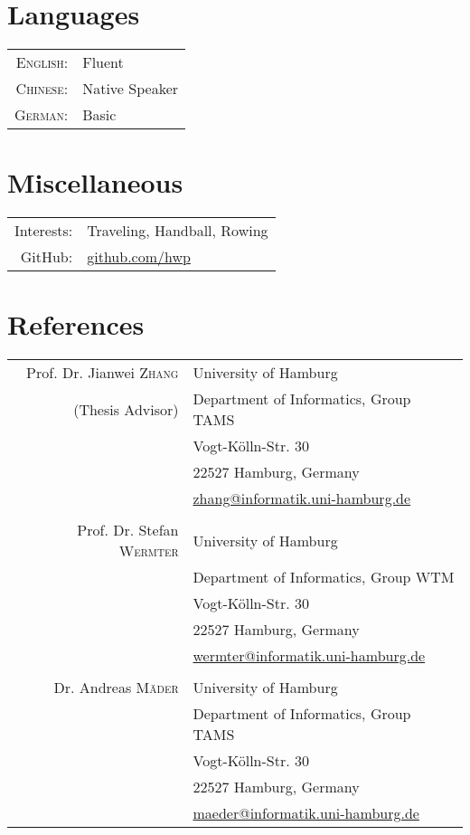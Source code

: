 \documentclass[a4paper,11pt]{article} %
\begin{document}

\section{Languages}

\begin{tabular}{rl}
  \textsc{English:} & Fluent \\
  \textsc{Chinese:} & Native Speaker \\
  \textsc{German:} & Basic \\
\end{tabular}

\section{Miscellaneous}

\begin{tabular}{rl}
  Interests: & Traveling, Handball, Rowing \\
  GitHub: & \href{https://github.com/hwp}{github.com/hwp} \\
\end{tabular}

\section{References}



\begin{tabular}{rl}
 Prof. Dr. Jianwei \textsc{Zhang} & University of Hamburg \\
 \footnotesize{(Thesis Advisor)} & Department of Informatics, Group TAMS \\
   & Vogt-Kölln-Str. 30 \\
   & 22527 Hamburg, Germany \\
   & \href{mailto:zhang@informatik.uni-hamburg.de}{zhang@informatik.uni-hamburg.de} \\
   \\
 Prof. Dr. Stefan \textsc{Wermter} & University of Hamburg \\
   & Department of Informatics, Group WTM\\
   & Vogt-Kölln-Str. 30 \\
   & 22527 Hamburg, Germany \\
   & \href{mailto:wermter@informatik.uni-hamburg.de}{wermter@informatik.uni-hamburg.de} \\
   \\
 Dr. Andreas \textsc{M\"ader} & University of Hamburg \\
   & Department of Informatics, Group TAMS\\
   & Vogt-Kölln-Str. 30 \\
   & 22527 Hamburg, Germany \\
   & \href{mailto:maeder@informatik.uni-hamburg.de}{maeder@informatik.uni-hamburg.de} \\
\end{tabular}
\end{document}
